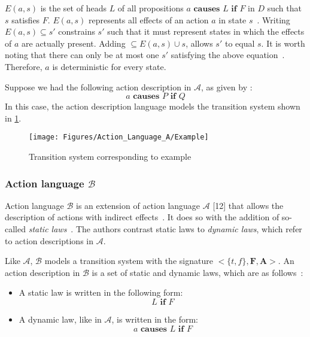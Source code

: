 $ E(a, s) $ is the set of heads $ L $ of all propositions $ a \textbf{ causes } L \textbf{ if } F $ in $ D $ such that $ s $ satisfies $ F $.
$ E(a, s) $ represents all effects of an action $ a $ in state $ s $~\citep{gelfond_action_1998}.
Writing $ E\left(a,s\right)\subseteq s' $ constrains $ s' $ such that it must represent states in which the effects of $ a $ are actually present.
Adding $ \subseteq E\left(a,s\right)\cup s $, allows $ s' $ to equal $ s $.
It is worth noting that there can only be at most one $ s' $ satisfying the above equation~\citep{gelfond_action_1998}.
Therefore, $ a $ is deterministic for every state.

Suppose we had the following action description in $\mathcal{A}$, as given by \citet{gelfond_action_1998}:
\[
a \textbf{ causes } P \textbf{ if } Q
\]
In this case, the action description language models the transition system shown in \cref{fig:action_language_a_example}.

\begin{figure}[h]
    \centering
    \texttt{[image: Figures/Action\_Language\_A/Example]}
    \caption{Transition system corresponding to example}
    \label{fig:action_language_a_example}
\end{figure}

\subsubsection{Action language $ \mathcal{B} $}
\label{subsubsec:action_language_b}

Action language $ \mathcal{B} $ is an extension of action language $ \mathcal{A} $ [12] that allows the description of actions with indirect effects~\citep{gelfond_action_1998}.
It does so with the addition of so-called \textit{static laws}~\citep{gelfond_action_1998}.
The authors contrast static laws to \textit{dynamic laws}, which refer to action descriptions in $\mathcal{A}$.

Like $\mathcal{A}$, $\mathcal{B}$ models a transition system with the signature $<\{t, f\},\boldsymbol{F},\boldsymbol{A}>$.
An action description in $\mathcal{B}$ is a set of static and dynamic laws, which are as follows~\citep{gelfond_action_1998}:

\begin{itemize}
    \item A static law is written in the following form:
        \[
        L \textbf{ if } F
        \]

    \item A dynamic law, like in $\mathcal{A}$, is written in the form:
        \[
        a \textbf{ causes } L \textbf{ if } F
        \]
\end{itemize}

